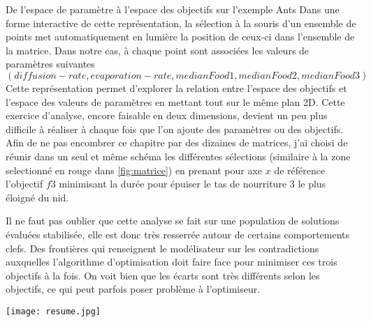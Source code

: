 \begin{testiv}{De l'espace de paramètre à l'espace des objectifs sur l'exemple Ants }{}
Dans une forme interactive de cette représentation, la sélection à la souris d'un ensemble de points met automatiquement en lumière la position de ceux-ci dans l'ensemble de la matrice. Dans notre cas, à chaque point sont associées les valeurs de paramètres suivantes $(diffusion-rate,evaporation-rate, medianFood1, medianFood2, medianFood3)$ Cette représentation permet d'explorer la relation entre l'espace des objectifs et l'espace des valeurs de paramètres en mettant tout sur le même plan 2D. Cette exercice d'analyse, encore faisable en deux dimensions, devient un peu plus difficile à réaliser à chaque fois que l'on ajoute des paramètres ou des objectifs. Afin de ne pas encombrer ce chapitre par des dizaines de matrices, j'ai choisi de réunir dans un seul et même schéma les différentes sélections (similaire à la zone selectionné en rouge dans \ref{fig:matrice}) en prenant pour axe $x$ de référence l'objectif $f3$ minimisant la durée pour épuiser le tas de nourriture 3 le plus éloigné du nid.

Il ne faut pas oublier que cette analyse se fait sur une population de solutions évaluées stabilisée, elle est donc très resserrée autour de certains comportements clefs. Des frontières qui renseignent le modélisateur sur les contradictions auxquelles l'algorithme d'optimisation doit faire face pour minimiser ces trois objectifs à la fois. On voit bien que les écarts sont très différents selon les objectifs, ce qui peut parfois poser problème à l'optimiseur.

\begin{center}
	\texttt{[image: resume.jpg]}
\end{center}


\end{testiv}
